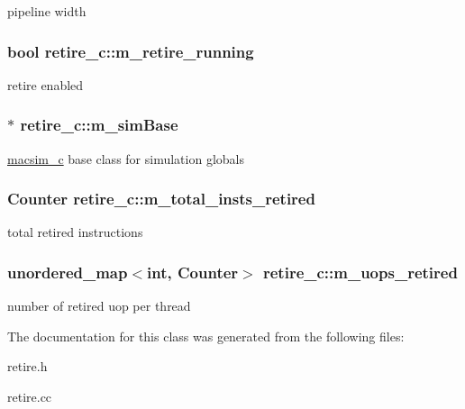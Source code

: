 \label{classretire__c_ae0cb9e43818642ff68a1565004cd3080}
pipeline width \hypertarget{classretire__c_a440ae82fa7ace4028c64aae7abc24337}{
\subsubsection[{m\_\-retire\_\-running}]{\setlength{\rightskip}{0pt plus 5cm}bool {\bf retire\_\-c::m\_\-retire\_\-running}}}
\label{classretire__c_a440ae82fa7ace4028c64aae7abc24337}
retire enabled \hypertarget{classretire__c_a373e6acbae9c640abe0cfeaf54c0be53}{
\subsubsection[{m\_\-simBase}]{$\ast$ {\bf retire\_\-c::m\_\-simBase}}}
\label{classretire__c_a373e6acbae9c640abe0cfeaf54c0be53}
\hyperlink{classmacsim__c}{macsim\_\-c} base class for simulation globals \hypertarget{classretire__c_a59114d1649ab7872ce25636b173353aa}{
\subsubsection[{m\_\-total\_\-insts\_\-retired}]{\setlength{\rightskip}{0pt plus 5cm}Counter {\bf retire\_\-c::m\_\-total\_\-insts\_\-retired}}}
\label{classretire__c_a59114d1649ab7872ce25636b173353aa}
total retired instructions \hypertarget{classretire__c_a5e284ce1f986ab38f7d337e2dc7d3977}{
\subsubsection[{m\_\-uops\_\-retired}]{\setlength{\rightskip}{0pt plus 5cm}unordered\_\-map$<$int, Counter$>$ {\bf retire\_\-c::m\_\-uops\_\-retired}}}
\label{classretire__c_a5e284ce1f986ab38f7d337e2dc7d3977}
number of retired uop per thread 

The documentation for this class was generated from the following files:\begin{DoxyCompactItemize}
\item 
retire.h\item 
retire.cc\end{DoxyCompactItemize}

